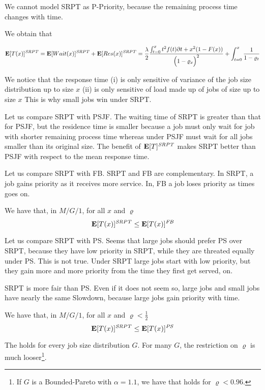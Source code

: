We cannot model SRPT as P-Priority, because the remaining process time changes with time.

We obtain that

\begin{equation}
\label{sec:SRPT-Mean-Time-Size}
\expected{T(x)}^{\mathit{SRPT}}=
\expected{Wait(x)}^{\mathit{SRPT}}+\expected{Res(x)}^{\mathit{SRPT}}=
\frac{\lambda}{2}\frac{\int_{t=0}^{x}t^{2}f(t)\partial t + x^{2}(1-F(x))}{\Big(1-\varrho_{x}\Big)^{2}}+
\int_{t=0}^{x}\frac{1}{1-\varrho_{t}}
\end{equation}

We notice that the response time
(i) is only sensitive of variance of the job size distribution up to size $x$
(ii) is only sensitive of load made up of jobs of size up to size $x$
This is why small jobs win under SRPT.

Let us compare SRPT with PSJF.
The waiting time of SRPT is greater than that for PSJF, but the residence time is smaller because a job must only wait for job with shorter remaining process time whereas under PSJF must wait for all jobs smaller than its original size.
The benefit of $\mathbf{E}[T]^{\mathit{SRPT}}$ makes SRPT better than PSJF with respect to the mean response time.

Let us compare SRPT with FB.
SRPT and FB are complementary. In SRPT, a job gains priority as it receives more service. In, FB a job loses priority as times goes on.

We have that, in $M/G/1$, for all $x$ and $\varrho$
\begin{equation}
\mathbf{E}[T(x)]^{\mathit{SRPT}}\leq\mathbf{E}[T(x)]^{\mathit{FB}}
\end{equation}

Let us compare SRPT with PS.
Seems that large jobs should prefer PS over SRPT, because they have low priority in SRPT, while they are threated equally under PS. This is not true. Under SRPT large jobs start with low priority, but they gain more and more priority from the time they first get served, on.

SRPT is more fair than PS. Even if it does not seem so, large jobs and small jobs have nearly the same Slowdown, because large jobs gain priority with time.

\begin{theorem}
\label{thm:All-Can-Win}
We have that, in $M/G/1$, for all $x$ and $\varrho<\frac{1}{2}$
\begin{equation}
\label{eqn:All-Can-Win}
\expected{T(x)}^{\mathit{SRPT}}\leq\expected{T(x)}^{\mathit{PS}}
\end{equation}
\end{theorem}

The  holds for every job size distribution $G$. For many $G$, the restriction on $\varrho$ is much looser\footnote{If $G$ is a Bounded-Pareto with $\alpha=1.1$, we have that  holds for $\varrho<0.96$.}.




